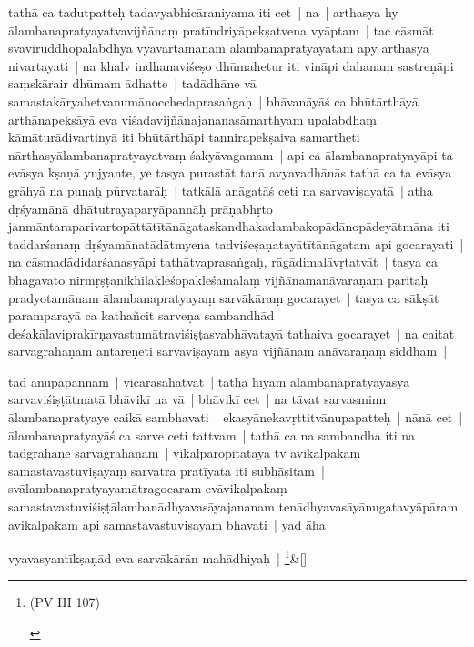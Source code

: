 \documentclass[article,a4paper]{memoir}
\begin{document}
	  \pstart tathā\- ca tadutpatteḥ tadavyabhicā\-raniyama iti cet | na | arthasya hy ā\-lambanapratyayatvavijñā\-naṃ pratī\-ndriyā\-pekṣatvena vyā\-ptam | tac cā\-smā\-t svaviruddhopalabdhyā\- vyā\-vartamā\-nam ā\-lambanapratyayatā\-m apy arthasya nivartayati | na khalv indhanaviśeṣo dhū\-mahetur iti vinā\-pi dahanaṃ sastreṇā\-pi saṃskā\-rair dhū\-mam ā\-dhatte | tadā\-dhā\-ne vā\- samastakā\-ryahetvanumā\-nocchedaprasaṅgaḥ | bhā\-vanā\-yā\-ś ca bhū\-tā\-rthā\-yā\- arthā\-napekṣā\-yā\- eva viśadavijñā\-najananasā\-marthyam upalabdhaṃ kā\-mā\-turā\-divartinyā\- iti bhū\-tā\-rthā\-pi tannirapekṣaiva samartheti nā\-rthasyā\-lambanapratyayatvaṃ śakyā\-vagamam | api ca ā\-lambanapratyayā\-pi ta evā\-sya kṣaṇā\- yujyante, ye tasya purastā\-t tanā\- avyavadhā\-nā\-s tathā\- ca ta evā\-sya grā\-hyā\- na punaḥ pū\-rvatarā\-ḥ | tatkā\-lā\- anā\-gatā\-ś ceti na sarvaviṣayatā\- | atha dṛśyamā\-nā\- dhā\-tutrayaparyā\-pannā\-ḥ prā\-ṇabhṛto janmā\-ntaraparivartopā\-ttā\-tī\-tā\-nā\-gataskandhakadambakopā\-dā\-nopā\-deyā\-tmā\-na iti taddarśanaṃ dṛśyamā\-natā\-dā\-tmyena tadviśeṣaṇatayā\-tī\-tā\-nā\-gatam api gocarayati | na cā\-smadā\-didarśanasyā\-pi tathā\-tvaprasaṅgaḥ, rā\-gā\-dimalā\-vṛtatvā\-t | tasya ca bhagavato nirmṛṣṭanikhilakleśopakleśamalaṃ vijñā\-namanā\-varaṇaṃ paritaḥ pradyotamā\-nam ā\-lambanapratyayaṃ sarvā\-kā\-raṃ gocarayet | tasya ca sā\-kṣā\-t paramparayā\- ca kathañcit sarveṇa sambandhā\-d deśakā\-laviprakī\-rṇavastumā\-traviśiṣṭasvabhā\-vatayā\- tathaiva gocarayet | na caitat sarvagrahaṇam antareṇeti sarvaviṣayam asya vijñā\-nam anā\-varaṇaṃ siddham | 
	\pend
      

	  \pstart tad anupapannam | vicā\-rā\-sahatvā\-t | tathā\- hī\-yam ā\-lambanapratyayasya sarvaviśiṣṭā\-tmatā\- bhā\-vikī\- na vā\- | bhā\-vikī\- cet | na tā\-vat sarvasminn ā\-lambanapratyaye caikā\- sambhavati | ekasyā\-nekavṛttitvā\-nupapatteḥ | nā\-nā\- cet | ā\-lambanapratyayā\-ś ca sarve ceti tattvam | tathā\- ca na sambandha iti na tadgrahaṇe sarvagrahaṇam | vikalpā\-ropitatayā\- tv avikalpakaṃ samastavastuviṣayaṃ sarvatra pratī\-yata iti subhā\-ṣitam | svā\-lambanapratyayamā\-tragocaram evā\-vikalpakaṃ samastavastuviśiṣṭā\-lambanā\-dhyavasā\-yajananam tenā\-dhyavasā\-yā\-nugatavyā\-pā\-ram avikalpakam api samastavastuviṣayaṃ bhavati | yad ā\-ha 
	\pend
      
	    
	    \stanza[\smallbreak]
vyavasyantī\-kṣaṇā\-d eva sarvā\-kā\-rā\-n mahā\-dhiyaḥ | \footnote{\begin{english}(PV III 107)\end{english}}\&[\smallbreak]
\end{document}
